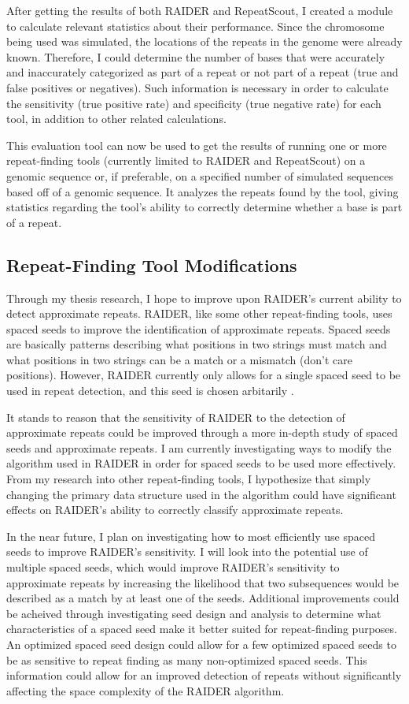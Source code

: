 \documentclass[12pt, doublespace]{article}
\begin{document}
After getting the results of both RAIDER and RepeatScout, I created a module to calculate relevant statistics about their performance. Since the chromosome being used was simulated, the locations of the repeats in the genome were already known. Therefore, I could determine the number of bases that were accurately and inaccurately categorized as part of a repeat or not part of a repeat (true and false positives or negatives). Such information is necessary in order to calculate the sensitivity (true positive rate) and specificity (true negative rate) for each tool, in addition to other related calculations.

This evaluation tool can now be used to get the results of running one or more repeat-finding tools (currently limited to RAIDER and RepeatScout) on a genomic sequence or, if preferable, on a specified number of simulated sequences based off of a genomic sequence. It analyzes the repeats found by the tool, giving statistics regarding the tool's ability to correctly determine whether a base is part of a repeat.

\subsection{Repeat-Finding Tool Modifications}
Through my thesis research, I hope to improve upon RAIDER's current ability to detect approximate repeats. 
RAIDER, like some other repeat-finding tools, uses spaced seeds to improve the identification of approximate repeats. Spaced seeds are basically patterns describing what positions in two strings must match and what positions in two strings can be a match or a mismatch (don't care positions). However, RAIDER currently only allows for a single spaced seed to be used in repeat detection, and this seed is chosen arbitarily \cite{figueroa2013raiderpaper}. 

It stands to reason that the sensitivity of RAIDER to the detection of approximate repeats could be improved through a more in-depth study of spaced seeds and approximate repeats. I am currently investigating ways to modify the algorithm used in RAIDER in order for spaced seeds to be used more effectively. From my research into other repeat-finding tools, I hypothesize that simply changing the primary data structure used in the algorithm could have significant effects on RAIDER's ability to correctly classify approximate repeats.


In the near future, I plan on investigating how to most efficiently use spaced seeds to improve RAIDER's sensitivity. I will look into the potential use of multiple spaced seeds, which would improve RAIDER's sensitivity to approximate repeats by increasing the likelihood that two subsequences would be described as a match by at least one of the seeds. Additional improvements could be acheived through investigating seed design and analysis to determine what characteristics of a spaced seed make it better suited for repeat-finding purposes. An  optimized spaced seed design could allow for a few optimized spaced seeds to be as sensitive to repeat finding as many non-optimized spaced seeds. This information could allow for an improved detection of repeats without significantly affecting the space complexity of the RAIDER algorithm.




\end{document}
